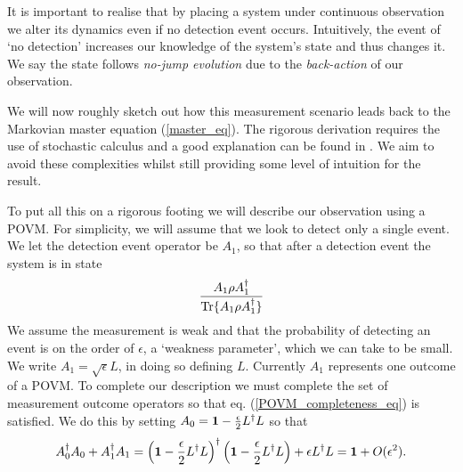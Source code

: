 It is important to realise that by placing a system under continuous observation we alter its dynamics even if no detection event occurs. Intuitively, the event of `no detection' increases our knowledge of the system's state and thus changes it. We say the state follows \textit{no-jump evolution} due to the \textit{back-action} of our observation.

We will now roughly sketch out how this measurement scenario leads back to the Markovian master equation (\ref{master_eq}). The rigorous derivation requires the use of stochastic calculus and a good explanation can be found in \cite{brun}. We aim to avoid these complexities whilst still providing some level of intuition for the result. 

To put all this on a rigorous footing we will describe our observation using a POVM. For simplicity, we will assume that we look to detect only a single  event. We let the detection event operator be $A_1$, so that after a detection event the system is in state
\begin{align}
  \frac{A_1 \rho A_1^\dagger}{\operatorname{Tr}\{A_1 \rho A_1^\dagger\}}
\end{align}
We assume the measurement is weak and that the probability of detecting an event is on the order of $\epsilon$, a `weakness parameter', which we can take to be small. We write $A_1 = \sqrt{\epsilon} L$, in doing so defining $L$. Currently $A_1$ represents one outcome of a POVM. To complete our description we must complete the set of measurement outcome operators so that eq. (\ref{POVM_completeness_eq}) is satisfied. We do this by setting $A_0 = \mathbf{1} - \frac{\epsilon}{2} L^\dagger L$ so that
\begin{align}
  A_0^\dagger A_0 + A_1^\dagger A_1 = \left( \mathbf{1} - \frac{\epsilon}{2} L^\dagger L\right)^\dagger \left( \mathbf{1} - \frac{\epsilon}{2} L^\dagger L\right) + \epsilon L^\dagger L = \mathbf{1} + O(\epsilon^2).
\end{align}

